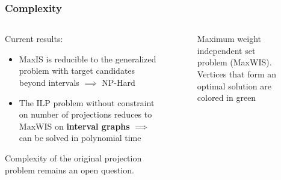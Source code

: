 \documentclass{beamer}
\begin{document}

\begin{frame}
  \frametitle{Complexity}

  \begin{columns}
    \begin{column}{.5\textwidth}
      Current results:
      \begin{itemize}
        \item MaxIS is reducible to the generalized problem with target candidates
          beyond intervals \( \implies \) NP-Hard
        \item The ILP problem without constraint on number of
          projections reduces to MaxWIS on \textbf{interval graphs}  \( \implies \) can be solved in polynomial time
      \end{itemize}

      \begin{alertblock}{}
        Complexity of the original projection problem remains an open question.
      \end{alertblock}
    \end{column}
    \begin{column}{.5\textwidth}
      \begin{figure}[ht]
        \centering
        \caption{Maximum weight independent set problem (MaxWIS). Vertices that form an optimal solution are colored in green}
        \label{fig:maxwis}
      \end{figure}
    \end{column}
  \end{columns}
\end{frame}
\end{document}
